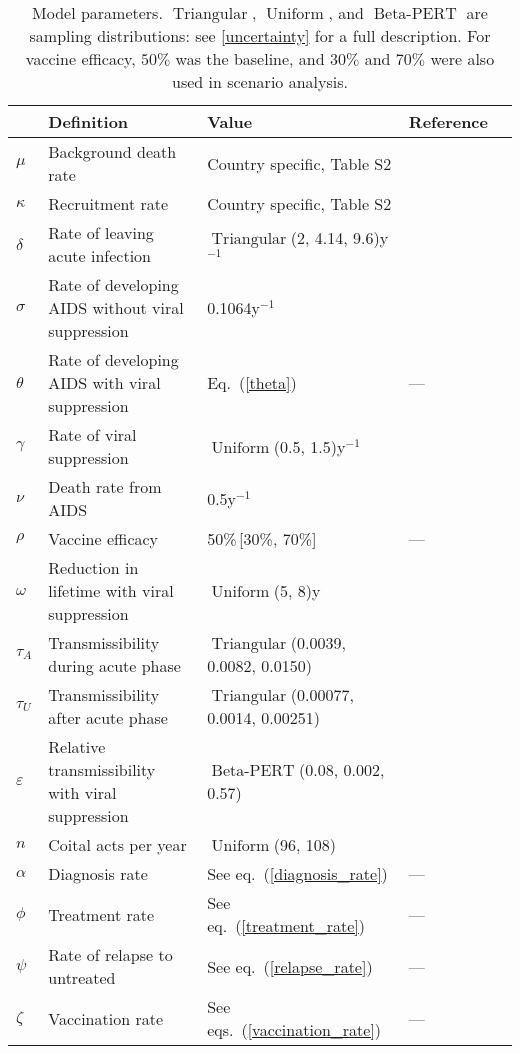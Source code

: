 \documentclass{article}
\DeclareMathOperator{\Uniform}{Uniform}
\DeclareMathOperator{\Triangular}{Triangular}
\DeclareMathOperator{\BetaPERT}{Beta-PERT}
\begin{document}
\begin{table}
  \begin{center}
    \begin{tabularx}{\textwidth}{lXlll}
      \hline
      & Definition & Value & Reference \\
      \hline
      $\mu$ & Background death rate & Country specific, Table S2
      & \cite{World_Development_Indicators2013-ee} \\
      $\kappa$ & Recruitment rate & Country specific, Table S2
      & \cite{World_Development_Indicators2013-ee, WorldBankpg} \\
      $\delta$	& Rate of leaving acute infection
      & $\Triangular$(2, 4.14, 9.6)\;y$^{-1}$
      & \cite{Hollingsworth2008-iy} \\
      $\sigma$	& Rate of developing AIDS without viral suppression
      & 0.1064\;y$^{-1}$ & \cite{Morgan2002-cq} \\
      $\theta$ & Rate of developing AIDS with viral suppression
      & Eq.~(\ref{theta}) & --- \\
      $\gamma$ & Rate of viral suppression
      & $\Uniform$(0.5, 1.5)\;y$^{-1}$
      & \cite{Currie2009-yz} \\
      $\nu$ & Death rate from AIDS & 0.5\;y$^{-1}$
      & \cite{Morgan2002-cq} \\
      $\rho$ & Vaccine efficacy & 50\%\,[30\%, 70\%] & --- \\
      $\omega$	& Reduction in lifetime with viral suppression
      & $\Uniform$(5, 8)\;y
      & \cite{Unaids2014-ue, Samji2013-kf} \\
      $\tau_{A}$ & Transmissibility during acute phase
      & $\Triangular$(0.0039, 0.0082, 0.0150)
      & \cite{Skarbinski2015-ni,Wawer2005-us}\\
      $\tau_{U}$ & Transmissibility after acute phase
      & $\Triangular$(0.00077, 0.0014, 0.00251)
      & \cite{Hughes2012-so} \\
      $\varepsilon$ & Relative transmissibility with
      viral suppression & $\BetaPERT$(0.08, 0.002, 0.57)
      & \cite{Donnell2010-xo} \\
      $n$ & Coital acts per year & $\Uniform$(96, 108)
      & \cite{Wawer2005-us,Abdool_Karim2010-cm}\\
      $\alpha$ & Diagnosis rate & See eq.~(\ref{diagnosis_rate}) & --- \\
      $\phi$ & Treatment rate & See eq.~(\ref{treatment_rate}) & --- \\
      $\psi$ & Rate of relapse to untreated & See eq.~(\ref{relapse_rate})
      & --- \\
      $\zeta$ & Vaccination rate & See eqs.~(\ref{vaccination_rate}) & --- \\
      \hline
    \end{tabularx}
    \caption{Model parameters. $\Triangular$, $\Uniform$, and
      $\BetaPERT$ are sampling distributions: see
      \autoref{uncertainty} for a full description.  For vaccine
      efficacy, $50\%$ was the baseline, and $30\%$ and $70\%$ were
      also used in scenario analysis.}
    \label{model_param}
  \end{center}
\end{table}
\end{document}
